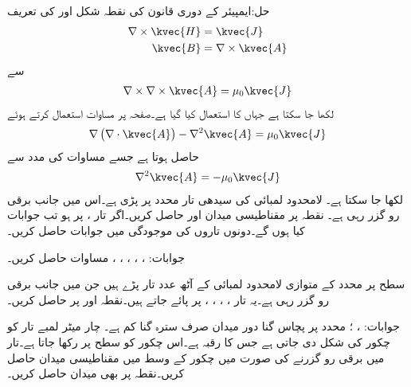 حل:ایمپیئر کے دوری قانون کی نقطہ شکل اور  کی تعریف
\begin{align*}
\nabla \times \kvec{H}&=\kvec{J}\\
\kvec{B}&=\nabla \times \kvec{A}
\end{align*}
سے
\begin{align*}
\nabla \times \nabla \times \kvec{A}=\mu_0 \kvec{J}
\end{align*}
لکھا جا سکتا ہے جہاں  کا استعمال کیا گیا ہے۔صفحہ  پر مساوات  استعمال کرتے ہوئے
\begin{align*}
\nabla \left(\nabla \cdot \kvec{A} \right)-\nabla^2 \kvec{A}=\mu_0 \kvec{J}
\end{align*}
حاصل ہوتا ہے جسے مساوات  کی مدد سے
\begin{align}
\nabla^2 \kvec{A}=-\mu_0 \kvec{J}
\end{align}
لکھا جا سکتا ہے۔
\newpage
{}
لامحدود لمبائی کی سیدھی تار  محدد پر پڑی ہے۔اس میں  جانب  برقی رو گزر رہی ہے۔ نقطہ  پر مقناطیسی میدان  اور  حاصل کریں۔اگر تار ،  پر ہو تب جوابات کیا ہوں گے۔دونوں تاروں کی موجودگی میں جوابات حاصل کریں۔ 

جوابات: ، ، ، ، ، 
مساوات  حاصل کریں۔

سطح  پر  محدد کے متوازی لامحدود لمبائی کے آٹھ عدد تار پڑے ہیں جن میں  جانب  برقی رو گزر رہی ہے۔یہ تار ، ، ، ،  پر پائے جاتے ہیں۔نقطہ  اور  پر  حاصل کریں۔

جوابات: ، ؛ محدد پر پچاس گنا دور میدان صرف سترہ گنا کم ہے۔
چار میٹر لمبے تار کو چکور کی شکل دی جاتی ہے جس کا رقبہ  ہے۔اس چکور کو  سطح پر رکھا جاتا ہے۔تار میں برقی رو  گزرنے کی صورت میں چکور کے وسط  میں مقناطیسی میدان  حاصل کریں۔نقطہ  پر بھی میدان حاصل کریں۔

